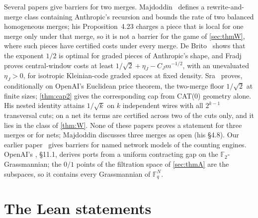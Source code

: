 \documentclass[10pt]{amsart}
\theoremstyle{plain}
\theoremstyle{definition}
\theoremstyle{remark}
\numberwithin{equation}{section}
\newcommand{\F}{\mathbb{F}}
\begin{document}
Several papers give barriers for two merges. Majdoddin~\cite{Maj26} defines a rewrite-and-merge class containing
Anthropic's recursion and bounds the rate of two balanced homogeneous merges; his Proposition~4.23 charges a piece
that is local for one merge only under that merge, so it is not a barrier for the game of \cref{sec:thmW}, where
such pieces have certified costs under every merge. De Brito~\cite{deBrito26} shows that the exponent $1/2$ is
optimal for graded pieces of Anthropic's shape, and Fradj~\cite{Fradj26} proves central-window costs at least
$1/\sqrt2+\eta_J-C_Jm^{-1/2}$, with an unevaluated $\eta_J>0$, for isotropic Kleinian-code graded spaces at fixed
density. Sra~\cite{Sra26} proves, conditionally on OpenAI's Euclidean price theorem, the two-merge floor
$1/\sqrt2$ at finite sizes; \cref{thm:cap2} gives the corresponding cap from CAT(0) geometry alone. His nested
identity attains $1/\sqrt k$ on $k$ independent wires with all $2^{k-1}$ transversal cuts; on a net its terms are
certified across two of the cuts only, and it lies in the class of \cref{thm:W}. None of these papers proves a
statement for three merges or for nets; Majdoddin discusses three merges as open (his \S4.8). Our earlier paper~\cite{Tul26barrier} gives barriers for named network models of the counting
engines. OpenAI's \cite{OpenAIEG}, \S11.1, derives ports from a uniform contracting gap on the $\F_2$-Grassmannian;
the $0/1$ points of the filtration space of \cref{sec:thmA} are the subspaces, so it contains every
Grassmannian of $\F_q^N$.

\section{The Lean statements}\label{sec:lean}
\end{document}
